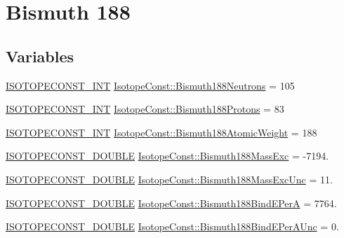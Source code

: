 \hypertarget{group___isotope_const-_bismuth-_bi188}{}\section{Bismuth 188}
\label{group___isotope_const-_bismuth-_bi188}
\subsection*{Variables}
\begin{DoxyCompactItemize}
\item 
\mbox{\hyperlink{group___isotope_const-_macros_ga5f18360b3e99483a35c32d789e62621c}{I\+S\+O\+T\+O\+P\+E\+C\+O\+N\+S\+T\+\_\+\+I\+NT}} \mbox{\hyperlink{group___isotope_const-_bismuth-_bi188_ga1ad9cbc56dfd7d1bb400d93d90b9ceab}{Isotope\+Const\+::\+Bismuth188\+Neutrons}} = 105
\item 
\mbox{\hyperlink{group___isotope_const-_macros_ga5f18360b3e99483a35c32d789e62621c}{I\+S\+O\+T\+O\+P\+E\+C\+O\+N\+S\+T\+\_\+\+I\+NT}} \mbox{\hyperlink{group___isotope_const-_bismuth-_bi188_ga313d3435b1f1ccb98b038189caf70ef3}{Isotope\+Const\+::\+Bismuth188\+Protons}} = 83
\item 
\mbox{\hyperlink{group___isotope_const-_macros_ga5f18360b3e99483a35c32d789e62621c}{I\+S\+O\+T\+O\+P\+E\+C\+O\+N\+S\+T\+\_\+\+I\+NT}} \mbox{\hyperlink{group___isotope_const-_bismuth-_bi188_gadc90260b5cc508892985a4f38c474f19}{Isotope\+Const\+::\+Bismuth188\+Atomic\+Weight}} = 188
\item 
\mbox{\hyperlink{group___isotope_const-_macros_ga8f45a7272ce02c0b4c65c44636ed719a}{I\+S\+O\+T\+O\+P\+E\+C\+O\+N\+S\+T\+\_\+\+D\+O\+U\+B\+LE}} \mbox{\hyperlink{group___isotope_const-_bismuth-_bi188_ga1f9b59eec0aa8df4194155f8e20e243f}{Isotope\+Const\+::\+Bismuth188\+Mass\+Exc}} = -\/7194.
\item 
\mbox{\hyperlink{group___isotope_const-_macros_ga8f45a7272ce02c0b4c65c44636ed719a}{I\+S\+O\+T\+O\+P\+E\+C\+O\+N\+S\+T\+\_\+\+D\+O\+U\+B\+LE}} \mbox{\hyperlink{group___isotope_const-_bismuth-_bi188_ga9abcb3d229080be5d2673c29e9899f69}{Isotope\+Const\+::\+Bismuth188\+Mass\+Exc\+Unc}} = 11.
\item 
\mbox{\hyperlink{group___isotope_const-_macros_ga8f45a7272ce02c0b4c65c44636ed719a}{I\+S\+O\+T\+O\+P\+E\+C\+O\+N\+S\+T\+\_\+\+D\+O\+U\+B\+LE}} \mbox{\hyperlink{group___isotope_const-_bismuth-_bi188_gada93014c1d6a332f970020a6147cbdf3}{Isotope\+Const\+::\+Bismuth188\+Bind\+E\+PerA}} = 7764.
\item 
\mbox{\hyperlink{group___isotope_const-_macros_ga8f45a7272ce02c0b4c65c44636ed719a}{I\+S\+O\+T\+O\+P\+E\+C\+O\+N\+S\+T\+\_\+\+D\+O\+U\+B\+LE}} \mbox{\hyperlink{group___isotope_const-_bismuth-_bi188_gaf347aa33ceb07ce93e7c37cc3e0c27b9}{Isotope\+Const\+::\+Bismuth188\+Bind\+E\+Per\+A\+Unc}} = 0.

\end{DoxyCompactItemize}
